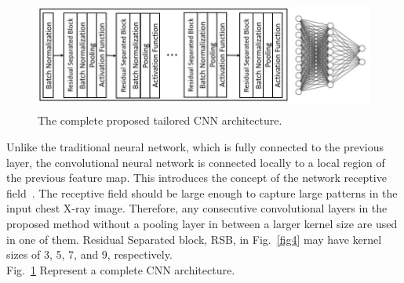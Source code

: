 \begin{figure}
    \begin{center}
    \includegraphics[height=37mm,width=14.0cm]{Figures/fig5.jpg}
    \caption{The complete proposed tailored CNN architecture.}
    \label{fig5}
    \end{center}
    \end{figure}
    
Unlike the traditional neural network, which is fully connected to the previous layer, the convolutional neural network is connected locally to a local region of the previous feature map. This introduces the concept of the network receptive field~\cite{luo2016understanding}. The receptive field should be large enough to capture large patterns in the input chest X-ray image. Therefore, any consecutive convolutional layers in the proposed method without a pooling layer in between a larger kernel size are used in one of them. Residual Separated block, RSB, in Fig.~\ref{fig4} may have kernel sizes of 3, 5, 7, and 9, respectively.\\
Fig.~\ref{fig5} Represent a complete CNN architecture.



